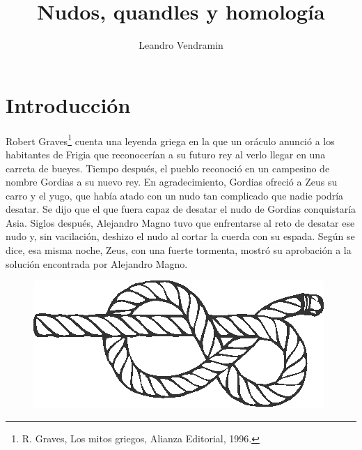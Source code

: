 \documentclass[graybox]{svmult}
\begin{document}
\lstset{language=GAP,
  showstringspaces=false,
  xleftmargin=0.0cm,
  xrightmargin=0.0cm,
  basicstyle=\small\ttfamily,
  frame=single,
  framerule=0pt,
}

\title*{Nudos, quandles y homología}
\author{Leandro Vendramin}


\maketitle



\section{Introducción}

Robert Graves\footnote{R. Graves, Los mitos griegos, Alianza Editorial, 1996.}
cuenta una leyenda griega en la que un oráculo anunció a los habitantes de
Frigia que reconocerían a su futuro rey al verlo llegar en una carreta de
bueyes.  Tiempo después, el pueblo reconoció en un campesino de nombre Gordias
a su nuevo rey. En agradecimiento, Gordias ofreció a Zeus su carro y el yugo,
que había atado con un nudo tan complicado que nadie podría desatar. Se dijo
que el que fuera capaz de desatar el nudo de Gordias conquistaría Asia.  Siglos
después, Alejandro Magno tuvo que enfrentarse al reto de desatar ese nudo y,
sin vacilación, deshizo el nudo al cortar la cuerda con su espada.  Según se
dice, esa misma noche, Zeus, con una fuerte tormenta, mostró su aprobación a la
solución encontrada por Alejandro Magno.

\begin{figure}
    \centering
	\includegraphics[scale=0.6]{images/rope}
\end{figure}
\end{document}
